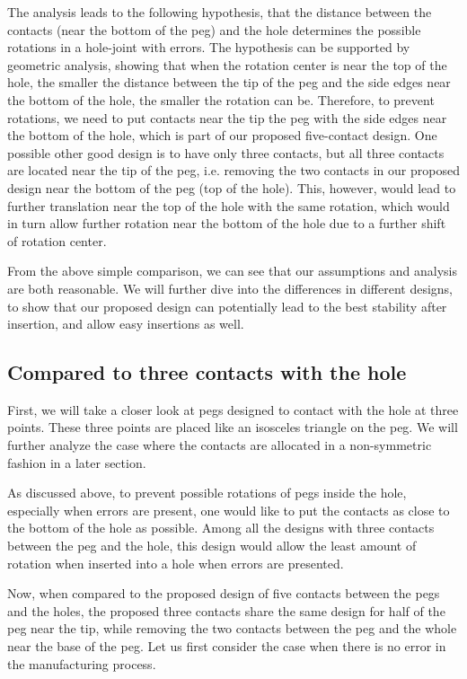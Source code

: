 \documentclass[11pt, twocolumn]{article}
\begin{document}
The analysis leads to the following hypothesis, that the distance between the contacts (near the bottom of the peg) and the hole determines the possible rotations in a hole-joint with errors. The hypothesis can be supported by geometric analysis, showing that when the rotation center is near the top of the hole, the smaller the distance between the tip of the peg and the side edges near the bottom of the hole, the smaller the rotation can be. Therefore, to prevent rotations, we need to put contacts near the tip the peg with the side edges near the bottom of the hole, which is part of our proposed five-contact design. One possible other good design is to have only three contacts, but all three contacts are located near the tip of the peg, i.e. removing the two contacts in our proposed design near the bottom of the peg (top of the hole). This, however, would lead to further translation near the top of the hole with the same rotation, which would in turn allow further rotation near the bottom of the hole due to a further shift of rotation center. 

From the above simple comparison, we can see that our assumptions and analysis are both reasonable. We will further dive into the differences in different designs, to show that our proposed design can potentially lead to the best stability after insertion, and allow easy insertions as well. 


\subsection{Compared to three contacts with the hole}

First, we will take a closer look at pegs designed to contact with the hole at three points. These three points are placed like an isosceles triangle on the peg. We will further analyze the case where the contacts are allocated in a non-symmetric fashion in a later section. 

As discussed above, to prevent possible rotations of pegs inside the hole, especially when errors are present, one would like to put the contacts as close to the bottom of the hole as possible. Among all the designs with three contacts between the peg and the hole, this design would allow the least amount of rotation when inserted into a hole when errors are presented. 

Now, when compared to the proposed design of five contacts between the pegs and the holes, the proposed three contacts share the same design for half of the peg near the tip, while removing the two contacts between the peg and the whole near the base of the peg. Let us first consider the case when there is no error in the manufacturing process. 
\end{document}
